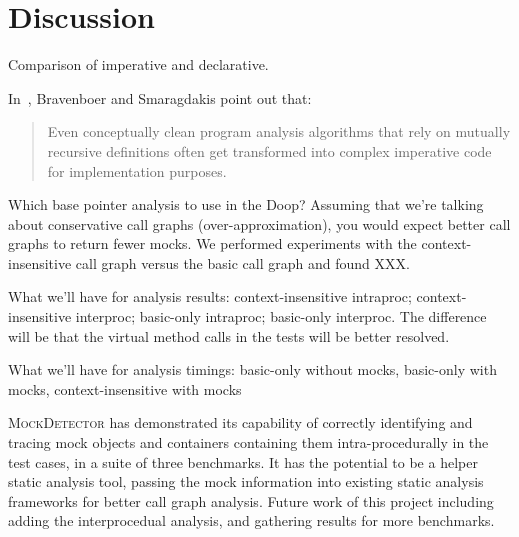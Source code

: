 \section{Discussion}
\label{sec:discussion}

Comparison of imperative and declarative.

In~\cite{bravenboer09:_stric_declar_specif_sophis_point_analy}, Bravenboer and Smaragdakis point out that:
\begin{quote}
Even conceptually clean program analysis algorithms that
rely on mutually recursive definitions often get transformed
into complex imperative code for implementation purposes.
\end{quote}


Which base pointer analysis to use in the Doop? Assuming that we're talking about conservative call graphs (over-approximation), you would expect better call graphs to return fewer mocks. We performed experiments with the context-insensitive call graph versus the basic call graph and found XXX.

What we'll have for analysis results: context-insensitive intraproc; context-insensitive interproc; basic-only intraproc; basic-only interproc. The difference will be that the virtual method calls in the tests will be better resolved.

What we'll have for analysis timings: basic-only without mocks, basic-only with mocks, context-insensitive with mocks

\textsc{MockDetector} has demonstrated its capability of correctly identifying and tracing mock objects and containers containing them intra-procedurally in the test cases, in a suite of three benchmarks. It has the potential to be a helper static analysis tool, passing the mock information into existing static analysis frameworks for better call graph analysis. Future work of this project including adding the interprocedual analysis, and gathering results for more benchmarks. 
